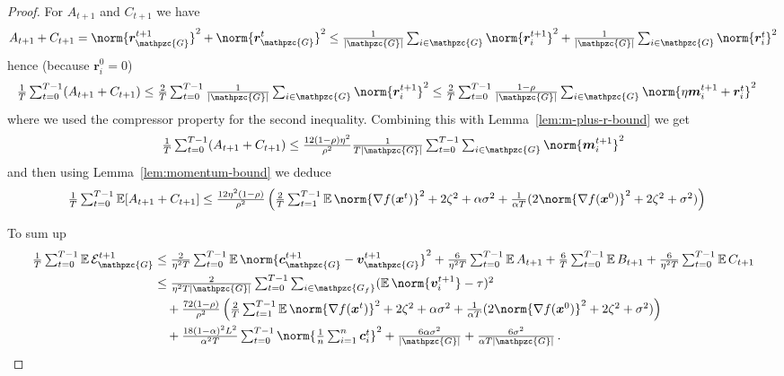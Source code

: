 \documentclass{article}
\newcommand{\gset}{\ensuremath{{\mathpzc{G}}}}
\newcommand{\gfset}{\ensuremath{{\mathpzc{G_f}}}}
\begin{document}
\begin{proof}
For $A_{t+1}$ and $C_{t+1}$ we have
\begin{align*}
  A_{t+1} + C_{t+1}
   =
  \norm{ \bm r_\gset^{t+1} }^2 
  + \norm{ \bm r_\gset^{t} }^2 
   \le 
  \tfrac{1}{|\gset|} \tsum_{i\in\gset} \norm{ \bm r_i^{t+1} }^2 + \tfrac{1}{|\gset|} \tsum_{i\in\gset} \norm{ \bm r_i^{t} }^2 
\end{align*}
hence (because $\bm r_i^0 = 0$)
\begin{align*}
  \tfrac{1}{T} \tsum_{t=0}^{T-1} (A_{t+1} + C_{t+1})
   & \le 
  \tfrac{2}{T} \tsum_{t=0}^{T-1} \tfrac{1}{|\gset|} \tsum_{i\in\gset} \norm{ \bm r_i^{t+1} }^2
   \le
  \tfrac{2}{T} \tsum_{t=0}^{T-1} \tfrac{1 - \rho}{|\gset|} \tsum_{i\in\gset} \norm{ \eta \mm_i^{t+1} + \bm r_i^t }^2
\end{align*}
where we used the compressor property for the second inequality. 
  Combining this with Lemma~\ref{lem:m-plus-r-bound} we get
  \[
    \tfrac{1}{T} \tsum_{t=0}^{T-1} (A_{t+1} + C_{t+1})
     \le 
    \tfrac{12 (1-\rho) \eta^2}{\rho^2} \tfrac{1}{T |\gset|} \tsum_{t=0}^{T-1} \tsum_{i\in\gset} \norm{ \mm_i^{t+1} }^2
  \]  
  and then using Lemma~\ref{lem:momentum-bound} we deduce
  \begin{align*}
    \tfrac{1}{T} \tsum_{t=0}^{T-1} \E [A_{t+1} + C_{t+1}]
     & \le 
    \tfrac{12\eta^2(1-\rho)}{\rho^2} 
    \left(      
      \tfrac{2}{T}\tsum_{t=1}^{T-1} \E \norm{\nabla f(\xx^t) }^2
      +  2  \zeta^2
      + \alpha\sigma^2                                             
      + \tfrac{1}{\alpha T}(2\norm{\nabla f(\xx^0) }^2
      + 2 \zeta^2
      + \sigma^2)
    \right)
  \end{align*}

To sum up
\begin{align*}
  \tfrac{1}{T} \tsum_{t=0}^{T-1} \E \cE_\gset^{t+1} 
   &\le 
  \tfrac{2}{\eta^2 T} \tsum_{t=0}^{T-1} \E \norm{ \cc_\gset^{t+1} - \vv_\gset^{t+1} }^2
  + \tfrac{6}{\eta^2 T} \tsum_{t=0}^{T-1} \E A_{t+1}
  + \tfrac{6}{T} \tsum_{t=0}^{T-1} \E B_{t+1}
  + \tfrac{6}{\eta^2 T} \tsum_{t=0}^{T-1} \E C_{t+1}
  \\
   &\le
  \tfrac{2}{\eta^2 T |\gset|} \tsum_{t=0}^{T-1} \tsum_{i\in\gfset} (\E \norm{ \vv_i^{t+1} } - \tau)^2 
  \\
   & \quad + 
  \tfrac{72(1-\rho)}{\rho^2} 
    \left(      
      \tfrac{2}{T}\tsum_{t=1}^{T-1} \E \norm{\nabla f(\xx^t) }^2
      +  2  \zeta^2
      + \alpha\sigma^2                                             
      + \tfrac{1}{\alpha T}(2\norm{\nabla f(\xx^0) }^2
      + 2 \zeta^2
      + \sigma^2)
    \right)
  \\
   & \quad +
  \tfrac{18(1-\alpha)^2 L^2}{\alpha^2T} \tsum_{t=0}^{T-1}
  \norm{ \tfrac{1}{n} \tsum_{i=1}^n \cc_i^t }^2
  + \tfrac{6\alpha\sigma^2}{|\gset|} + \tfrac{6\sigma^2}{\alpha T|\gset|} \, .
\end{align*}
\end{proof}
\end{document}
